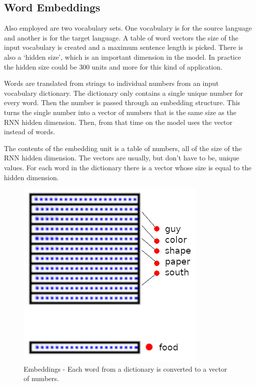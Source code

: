 \subsection{Word Embeddings}

Also employed are two vocabulary sets. One vocabulary is for the source language and another is for the target language. A table of word vectors the size of the input vocabulary is created and a maximum sentence length is picked. There is also a `hidden size', which is an important dimension in the model. In practice the hidden size could be 300 units and more for this kind of application.

Words are translated from strings to individual numbers from an input vocabulary dictionary. The dictionary only contains a single unique number for every word. Then the number is passed through an embedding structure. This turns the single number into a vector of numbers that is the same size as the RNN hidden dimension. Then, from that time on the model uses the vector instead of words.

The contents of the embedding unit is a table of numbers, all of the size of the RNN hidden dimension. The vectors are usually, but don\textquoteright t have to be, unique values. For each word in the dictionary there is a vector whose size is equal to the hidden dimension.

\begin{figure}[H]
	\begin{center}
		\includegraphics[scale=0.5]{diagram-embedding}
		
		
	\end{center}
	\caption[Word Embeddings]{Embeddings - Each word from a dictionary is converted to a vector of numbers.}
	

\end{figure}

